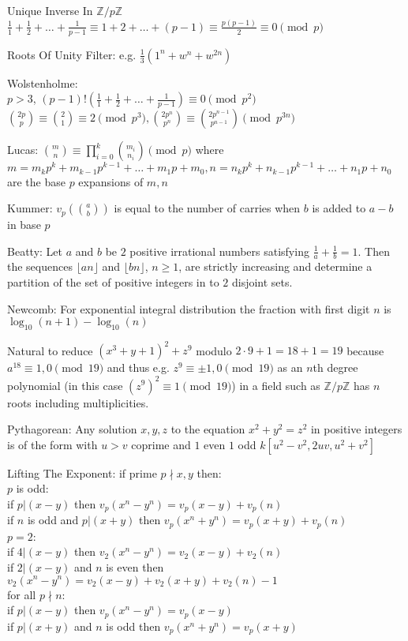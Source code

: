 Unique Inverse In $\mathbb{Z}/p \mathbb{Z}$ \\
$\frac{1}{1}+\frac{1}{2}+\dots+\frac{1}{p-1} \equiv 1+2+\dots+(p-1) \equiv \frac{p(p-1)}{2} \equiv 0 \pmod{p}$

Roots Of Unity Filter: e.g. $\frac{1}{3}(1^n+w^n+w^{2n})$

Wolstenholme: \\
$p>3$, $(p-1)!\left(\frac{1}{1}+\frac{1}{2}+\dots+\frac{1}{p-1} \right) \equiv 0 \pmod{p^2}$ \\
$\binom{2p}{p} \equiv \binom{2}{1} \equiv 2 \pmod{p^3}, \binom{2p^n}{p^n} \equiv \binom{2p^{n-1}}{p^{n-1}} \pmod {p^{3n}}$

Lucas: $\binom{m}{n} \equiv \prod_{i=0}^k \binom{m_i}{n_i} \pmod{p}$ where $m=m_k p^k+m_{k-1} p^{k-1} + \dots + m_1 p + m_0,n=n_k p^k+n_{k-1} p^{k-1} + \dots + n_1 p + n_0$ are the base $p$ expansions of $m,n$

Kummer: $v_p \left(\binom{a}{b} \right)$ is equal to the number of carries when $b$ is added to $a-b$ in base $p$

Beatty: Let $a$ and $b$ be $2$ positive irrational numbers satisfying $\frac{1}{a}+\frac{1}{b}=1$. Then the sequences $\lfloor an \rfloor$ and $\lfloor bn \rfloor$, $n \ge 1$, are strictly increasing and determine a partition of the set of positive integers in to $2$ disjoint sets.

Newcomb: For exponential integral distribution the fraction with first digit $n$ is $\log_{10}(n+1)-\log_{10}(n)$

Natural to reduce $(x^3+y+1)^2+z^9$ modulo $2 \cdot 9+1=18+1=19$ because $a^{18} \equiv 1,0 \pmod{19}$ and thus e.g. $z^9 \equiv \pm 1,0 \pmod{19}$ as an $n$th degree polynomial (in this case $(z^9)^2 \equiv 1 \pmod{19}$) in a field such as $\mathbb{Z}/p\mathbb{Z}$ has $n$ roots including multiplicities.

Pythagorean: Any solution $x,y,z$ to the equation $x^2+y^2=z^2$ in positive integers is of the form with $u>v$ coprime and $1$ even $1$ odd $k[u^2-v^2,2uv,u^2+v^2]$

Lifting The Exponent: if prime $p \nmid x,y$ then: \\
$p$ is odd: \\
if $p|(x-y)$ then $v_p(x^n-y^n)=v_p(x-y)+v_p(n)$ \\
if $n$ is odd and $p|(x+y)$ then $v_p(x^n+y^n)=v_p(x+y)+v_p(n)$ \\
$p=2$: \\
if $4|(x-y)$ then $v_2(x^n-y^n)=v_2(x-y)+v_2(n)$ \\
if $2|(x-y)$ and $n$ is even then $v_2(x^n-y^n)=v_2(x-y)+v_2(x+y)+v_2(n)-1$ \\
for all $p \nmid n$: \\
if $p|(x-y)$ then $v_p(x^n-y^n)=v_p(x-y)$ \\
if $p|(x+y)$ and $n$ is odd then $v_p(x^n+y^n)=v_p(x+y)$

